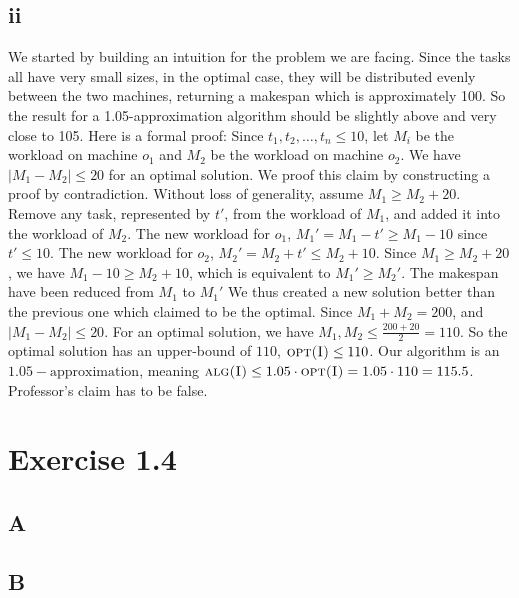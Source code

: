 \documentclass[11pt]{article}
\begin{document}
\subsection*{ii} \noindent
We started by building an intuition for the problem we are facing. 
Since the tasks all have very small sizes, in the optimal case, they will be distributed evenly between the two machines, 
returning a makespan which is approximately 100. So the result for a 1.05-approximation algorithm should be slightly above and very close to 105.
\newline
Here is a formal proof:  
Since $t_1, t_2, \dots, t_n \leq 10$, let $M_{i}$ be the workload on machine $o_{1}$ and $M_{2}$ be the workload on machine $o_{2}$.
We have $|M_{1} - M_{2}| \leq 20$ for an optimal solution. 
\newline
We proof this claim by constructing a proof by contradiction. Without loss of generality, assume $M_{1} \geq M_{2} + 20$. 
Remove any task, represented by $t'$, from the workload of $M_{1}$, and added it into the workload of $M_{2}$. 
The new workload for $o_{1}$, $M_{1}' = M_{1} - t' \geq M_{1} - 10$ since $t' \leq 10$. 
The new workload for $o_{2}$, $M_{2}' = M_{2} + t' \leq M_{2} + 10$. Since $M_{1} \geq M_{2} + 20$, we have $M_{1} - 10 \geq M_{2} + 10$, 
which is equivalent to $M_{1}' \geq M_{2}'$. The makespan have been reduced from $M_{1}$ to $M_{1}'$
We thus created a new solution better than the previous one which claimed to be the optimal. 
\newline
Since $M_{1} + M_{2} = 200$, and $|M_{1} - M_{2}| \leq 20$. For an optimal solution, we have $M_{1}, M_{2} \leq \frac{200 + 20}{2} = 110$.
So the optimal solution has an upper-bound of $110$, $\textsc{opt(I)} \leq 110$. 
Our algorithm is an $1.05-\text{approximation}$, meaning $\textsc{alg(I)} \leq 1.05 \cdot \textsc{opt(I)} = 1.05 \cdot 110 = 115.5$. 
\newline
Professor's claim has to be false.

\section*{Exercise 1.4}
\subsection*{A} \noindent
\subsection*{B} \noindent
\end{document}
